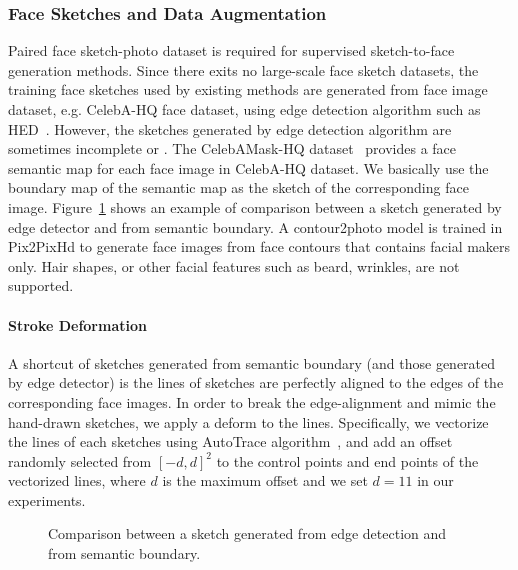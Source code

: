
\subsubsection{Face Sketches and Data Augmentation}
Paired face sketch-photo dataset is required for supervised sketch-to-face generation methods.
Since there exits no large-scale face sketch datasets, the training face sketches used by existing methods are generated from face image dataset, e.g. CelebA-HQ face dataset, using edge detection algorithm such as HED~\cite{HED}.
However, the sketches generated by edge detection algorithm are sometimes incomplete or . 
The CelebAMask-HQ dataset~\cite{CelebAMask-HQ} provides a face semantic map for each face image in CelebA-HQ dataset. We basically use the boundary map of the semantic map as the sketch of the corresponding face image. Figure~\ref{fig:sketch_data} shows an example of comparison between a sketch generated by edge detector and from semantic boundary.
%
A contour2photo model is trained in Pix2PixHd to generate face images from face contours that contains facial makers only. Hair shapes, or other facial features such as beard, wrinkles, are not supported. 

\paragraph{Stroke Deformation}
A shortcut of sketches generated from semantic boundary (and those generated by edge detector) is the lines of sketches are perfectly aligned to the edges of the corresponding face images. In order to break the edge-alignment and mimic the hand-drawn sketches, we apply a deform to the lines. Specifically, we vectorize the lines of each sketches using AutoTrace algorithm~\cite{AutoTrace}, and add an offset randomly selected from $[-d, d]^2$ to the control points and end points of the vectorized lines, where $d$ is the maximum offset and we set $d=11$ in our experiments.


\begin{figure}
	\centering
	\vspace{1.0cm}
	\caption{Comparison between a sketch generated from edge detection and from semantic boundary.}
	\label{fig:sketch_data}
\end{figure}